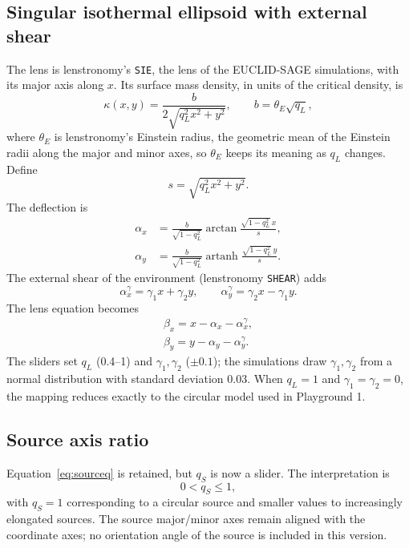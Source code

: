\documentclass[11pt,a4paper]{article}
\begin{document}
\subsection{Singular isothermal ellipsoid with external shear}
The lens is lenstronomy's \texttt{SIE}, the lens of the EUCLID-SAGE simulations, with its major axis along $x$. Its surface mass density, in units of the critical density, is
\begin{equation}
 \boxed{\kappa(x,y)=\frac{b}{2\sqrt{q_L^2x^2+y^2}}},\qquad b=\theta_E\sqrt{q_L},
 \label{eq:potential}
\end{equation}
where $\theta_E$ is lenstronomy's Einstein radius, the geometric mean of the Einstein radii along the major and minor axes, so $\theta_E$ keeps its meaning as $q_L$ changes. Define
\begin{equation}
 s=\sqrt{q_L^2x^2+y^2}.
\end{equation}
The deflection is~\cite{keeton1998}
\begin{align}
 \alpha_x &= \frac{b}{\sqrt{1-q_L^2}}\arctan\frac{\sqrt{1-q_L^2}\,x}{s},\\
 \alpha_y &= \frac{b}{\sqrt{1-q_L^2}}\operatorname{artanh}\frac{\sqrt{1-q_L^2}\,y}{s}.
\end{align}
The external shear of the environment (lenstronomy \texttt{SHEAR}) adds
\begin{equation}
 \alpha_x^{\gamma}=\gamma_1x+\gamma_2y,\qquad \alpha_y^{\gamma}=\gamma_2x-\gamma_1y .
\end{equation}
The lens equation becomes
\begin{align}
 \boxed{\beta_x=x-\alpha_x-\alpha_x^{\gamma}},\\
 \boxed{\beta_y=y-\alpha_y-\alpha_y^{\gamma}}.
\end{align}
The sliders set $q_L$ (0.4--1) and $\gamma_1,\gamma_2$ ($\pm0.1$); the simulations draw $\gamma_1,\gamma_2$ from a normal distribution with standard deviation 0.03. When $q_L=1$ and $\gamma_1=\gamma_2=0$, the mapping reduces exactly to the circular model used in Playground 1.

\subsection{Source axis ratio}
Equation~\eqref{eq:sourceq} is retained, but $q_S$ is now a slider. The interpretation is
\begin{equation}
 0<q_S\leq 1,
\end{equation}
with $q_S=1$ corresponding to a circular source and smaller values to increasingly elongated sources. The source major/minor axes remain aligned with the coordinate axes; no orientation angle of the source is included in this version.
\end{document}
